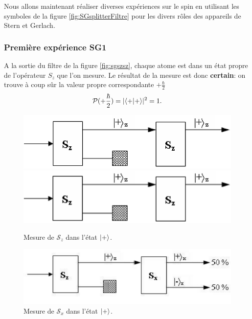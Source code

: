 Nous allons maintenant réaliser diverses expériences sur le spin en utilisant
les symboles de la figure \ref{fig:SGsplitterFiltre} pour les divers rôles des
appareils de Stern et Gerlach.

\subsubsection{Première expérience SG1}

A la sortie du filtre de la figure \ref{fig:sgszsz}, chaque atome est dans
un état propre de l'opérateur $S_{z}$ que l'on mesure. Le résultat de la
mesure est donc \textbf{certain}: on trouve à coup sûr la valeur propre
correspondante $+\frac{\hbar}{2}$%
\begin{equation}
\mathcal{P}(+\frac{\hbar}{2})=|\langle+\vert+\rangle|^{2}=1.
\end{equation}

\begin{figure}[ptbh]
\begin{minipage}[c]{.48\linewidth}
\centering
\ifcase\msipdfoutput
	\includegraphics[scale=.8]{graphics/SGSzSz.eps}
\else
	\includegraphics[scale=.8]{graphics/SGSzSz.pdf}
\fi
\caption{Mesure de $\mathcal{S}_{z}$ dans l'état $\vert+\rangle$.}%
\label{fig:sgszsz}%
\end{minipage} \hfill
\begin{minipage}[c]{.48\linewidth}
\centering
\includegraphics[scale=.8]{graphics/SGSzSx.pdf}
\caption{Mesure de $\mathcal{S}_{x}$ dans l'état $\vert+\rangle$.}%
\label{fig:sgszsx}%
\end{minipage}
\end{figure}


